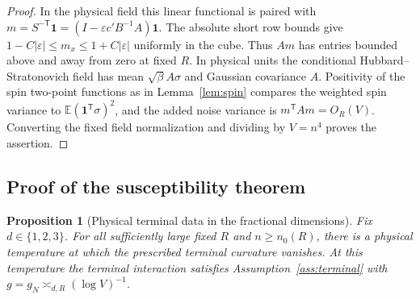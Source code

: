 \documentclass[11pt]{article}
\newtheorem{proposition}[theorem]{Proposition}
\theoremstyle{definition}
\newcommand{\one}{\mathbf 1}
\newcommand{\E}{\mathbb E}
\begin{document}
\begin{proof}
In the physical field this linear functional is paired with
\(m=S^{-\mathsf T}\one=(I-\varepsilon c'B^{-1}A)\one\).
The absolute short row bounds give
\(1-C|\varepsilon|\le m_x\le1+C|\varepsilon|\) uniformly in
the cube. Thus \(Am\) has entries bounded above and away from
zero at fixed \(R\). In physical units the conditional
Hubbard--Stratonovich field has mean \(\sqrt\beta A\sigma\)
and Gaussian covariance \(A\). Positivity of the spin
two-point functions as in Lemma~\ref{lem:spin} compares the
weighted spin variance to \(\E(\one^{\mathsf T}\sigma)^2\),
and the added noise variance is \(m^{\mathsf T}Am=O_R(V)\).
Converting the fixed field normalization and dividing by
\(V=n^4\) proves the assertion.
\end{proof}

\subsection{Proof of the susceptibility theorem}
\label{sec:proof-susceptibility}

\begin{proposition}[Physical terminal data in the fractional dimensions]
\label{prop:fractional-matched-data}
Fix \(d\in\{1,2,3\}\). For all sufficiently large fixed \(R\) and
\(n\ge n_0(R)\), there is a physical temperature at which the
prescribed terminal curvature vanishes. At this temperature the
terminal interaction satisfies Assumption~\ref{ass:terminal}
with \(g=g_N\asymp_{d,R}(\log V)^{-1}\).
\end{proposition}
\end{document}
